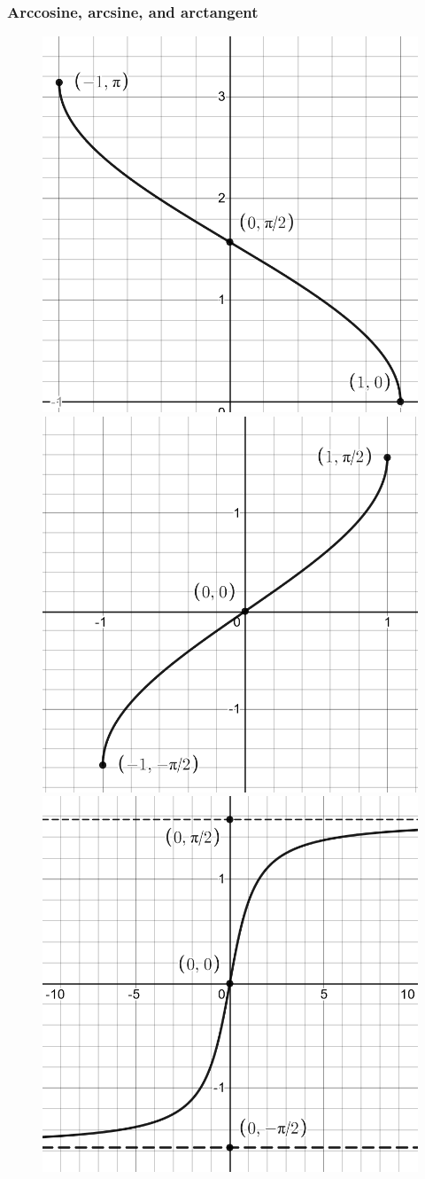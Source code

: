 \documentclass[letterpaper,9pt,fleqn]{extarticle}
\begin{document}
\subsubsection*{Arccosine, arcsine, and arctangent}
\vspace{-0.2in}
\begin{figure}[h]
\centering
\begin{minipage}{.333\textwidth}
  \centering
  \includegraphics[width=.25\linewidth]{desmos-graph-invcos}
\end{minipage}%
\begin{minipage}{.333\textwidth}
  \centering
  \includegraphics[width=.25\linewidth]{desmos-graph-invsin}
\end{minipage}%
\begin{minipage}{.333\textwidth}
  \centering
  \includegraphics[width=.25\linewidth]{desmos-graph-invtan}
\end{minipage}
\end{figure}
\end{document}
